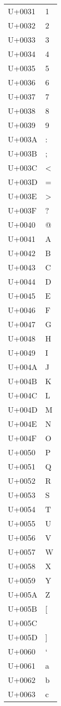 \documentclass{article}
\begin{document}
\begin{longtable}{ll}
U+0031 & 1 \\
U+0032 & 2 \\
U+0033 & 3 \\
U+0034 & 4 \\
U+0035 & 5 \\
U+0036 & 6 \\
U+0037 & 7 \\
U+0038 & 8 \\
U+0039 & 9 \\
U+003A & : \\
U+003B & ; \\
U+003C & < \\
U+003D & = \\
U+003E & > \\
U+003F & ? \\
U+0040 & @ \\
U+0041 & A \\
U+0042 & B \\
U+0043 & C \\
U+0044 & D \\
U+0045 & E \\
U+0046 & F \\
U+0047 & G \\
U+0048 & H \\
U+0049 & I \\
U+004A & J \\
U+004B & K \\
U+004C & L \\
U+004D & M \\
U+004E & N \\
U+004F & O \\
U+0050 & P \\
U+0051 & Q \\
U+0052 & R \\
U+0053 & S \\
U+0054 & T \\
U+0055 & U \\
U+0056 & V \\
U+0057 & W \\
U+0058 & X \\
U+0059 & Y \\
U+005A & Z \\
U+005B & [ \\
U+005C & \ \\
U+005D & ] \\
U+0060 & ` \\
U+0061 & a \\
U+0062 & b \\
U+0063 & c \\

\end{longtable}
\end{document}
